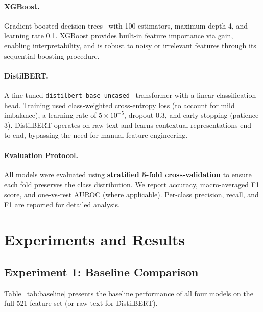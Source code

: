 \documentclass[12pt]{article}
\begin{document}
\paragraph{XGBoost.}
Gradient-boosted decision trees~\cite{xgboost} with 100 estimators,
maximum depth 4, and learning rate 0.1. XGBoost provides built-in
feature importance via gain, enabling interpretability, and is robust to
noisy or irrelevant features through its sequential boosting procedure.

\paragraph{DistilBERT.}
A fine-tuned \texttt{distilbert-base-uncased}~\cite{distilbert} transformer
with a linear classification head. Training used class-weighted
cross-entropy loss (to account for mild imbalance), a learning rate of
$5 \times 10^{-5}$, dropout 0.3, and early stopping (patience 3).
DistilBERT operates on raw text and learns contextual
representations end-to-end, bypassing the need for manual feature
engineering.

\paragraph{Evaluation Protocol.}
All models were evaluated using \textbf{stratified 5-fold cross-validation}
to ensure each fold preserves the class distribution. We report
accuracy, macro-averaged F1 score, and one-vs-rest AUROC (where applicable).
Per-class precision, recall, and F1 are reported for detailed analysis.

\section{Experiments and Results}
\label{sec:experiments}

\subsection{Experiment 1: Baseline Comparison}

Table~\ref{tab:baseline} presents the baseline performance of all four
models on the full 521-feature set (or raw text for DistilBERT).
\end{document}
